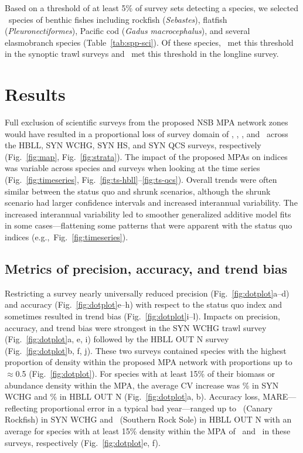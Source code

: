 \documentclass[12pt]{article}
\begin{document}
Based on a threshold of at least 5\% of survey sets detecting a species, we selected \nSpp\ species of benthic fishes including rockfish (\textit{Sebastes}), flatfish (\textit{Pleuronectiformes}), Pacific cod (\textit{Gadus macrocephalus}), and several elasmobranch species (Table~\ref{tab:spp-sci}). Of these species, \synNSpp\ met this threshold in the synoptic trawl surveys and \hbllNSpp\ met this threshold in the longline survey.

\section*{Results}

Full exclusion of scientific surveys from the proposed NSB MPA network zones would have resulted in a proportional loss of survey domain of \lostHBLL, \lostWCHG, \lostHS, and \lostQCS\ across the HBLL, SYN WCHG, SYN HS, and SYN QCS surveys, respectively (Fig.~\ref{fig:map}, Fig.~\ref{fig:strata}).
The impact of the proposed MPAs on indices was variable across species and surveys when looking at the time series (Fig.~\ref{fig:timeseries}, Fig.~\ref{fig:ts-hbll}--\ref{fig:ts-qcs}).
Overall trends were often similar between the status quo and shrunk scenarios, although the shrunk scenario had larger confidence intervals and increased interannual variability.
The increased interannual variability led to smoother generalized additive model fits in some cases---flattening some patterns that were apparent with the status quo indices (e.g.,~Fig.~\ref{fig:timeseries}).

\subsection*{Metrics of precision, accuracy, and trend bias}

Restricting a survey nearly universally reduced precision (Fig.~\ref{fig:dotplot}a--d) and accuracy (Fig.~\ref{fig:dotplot}e--h) with respect to the status quo index and sometimes resulted in trend bias (Fig.~\ref{fig:dotplot}i--l).
Impacts on precision, accuracy, and trend bias were strongest in the SYN WCHG trawl survey (Fig.~\ref{fig:dotplot}a, e, i) followed by the HBLL OUT N survey (Fig.~\ref{fig:dotplot}b, f, j).
These two surveys contained species with the highest proportion of density within the proposed MPA network with proportions up to $\approx$0.5 (Fig.~\ref{fig:dotplot}).
For species with at least 15\% of their biomass or abundance density within the MPA, the average CV increase was \precisionWCHGshrunk\% in SYN WCHG and \precisionHBLLshrunk\% in HBLL OUT N (Fig.~\ref{fig:dotplot}a, b).
Accuracy loss, MARE---reflecting proportional error in a typical bad year---ranged up to \canaryrockfishSYNWCHGslopere\ (Canary Rockfish) in SYN WCHG and \southernrocksoleHBLLslopere\ (Southern Rock Sole) in HBLL OUT N with an average for species with at least 15\% density within the MPA of \accuracyWCHGshrunk\ and \accuracyHBLLshrunk\ in these surveys, respectively (Fig.~\ref{fig:dotplot}e, f).
\end{document}

